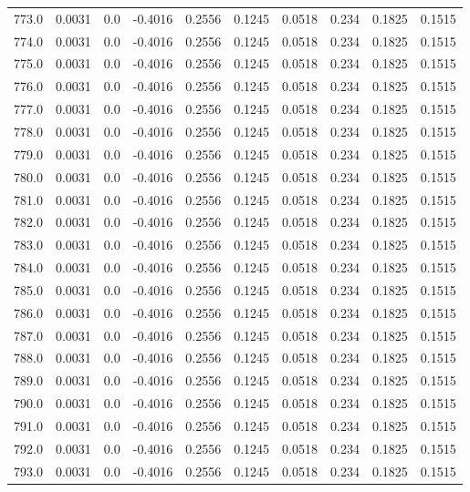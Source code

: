 \begin{longtable}{lrrrrrrrrr}
773.0 & 0.0031 & 0.0 & -0.4016 & 0.2556 & 0.1245 & 0.0518 & 0.234 & 0.1825 & 0.1515 \\
774.0 & 0.0031 & 0.0 & -0.4016 & 0.2556 & 0.1245 & 0.0518 & 0.234 & 0.1825 & 0.1515 \\
775.0 & 0.0031 & 0.0 & -0.4016 & 0.2556 & 0.1245 & 0.0518 & 0.234 & 0.1825 & 0.1515 \\
776.0 & 0.0031 & 0.0 & -0.4016 & 0.2556 & 0.1245 & 0.0518 & 0.234 & 0.1825 & 0.1515 \\
777.0 & 0.0031 & 0.0 & -0.4016 & 0.2556 & 0.1245 & 0.0518 & 0.234 & 0.1825 & 0.1515 \\
778.0 & 0.0031 & 0.0 & -0.4016 & 0.2556 & 0.1245 & 0.0518 & 0.234 & 0.1825 & 0.1515 \\
779.0 & 0.0031 & 0.0 & -0.4016 & 0.2556 & 0.1245 & 0.0518 & 0.234 & 0.1825 & 0.1515 \\
780.0 & 0.0031 & 0.0 & -0.4016 & 0.2556 & 0.1245 & 0.0518 & 0.234 & 0.1825 & 0.1515 \\
781.0 & 0.0031 & 0.0 & -0.4016 & 0.2556 & 0.1245 & 0.0518 & 0.234 & 0.1825 & 0.1515 \\
782.0 & 0.0031 & 0.0 & -0.4016 & 0.2556 & 0.1245 & 0.0518 & 0.234 & 0.1825 & 0.1515 \\
783.0 & 0.0031 & 0.0 & -0.4016 & 0.2556 & 0.1245 & 0.0518 & 0.234 & 0.1825 & 0.1515 \\
784.0 & 0.0031 & 0.0 & -0.4016 & 0.2556 & 0.1245 & 0.0518 & 0.234 & 0.1825 & 0.1515 \\
785.0 & 0.0031 & 0.0 & -0.4016 & 0.2556 & 0.1245 & 0.0518 & 0.234 & 0.1825 & 0.1515 \\
786.0 & 0.0031 & 0.0 & -0.4016 & 0.2556 & 0.1245 & 0.0518 & 0.234 & 0.1825 & 0.1515 \\
787.0 & 0.0031 & 0.0 & -0.4016 & 0.2556 & 0.1245 & 0.0518 & 0.234 & 0.1825 & 0.1515 \\
788.0 & 0.0031 & 0.0 & -0.4016 & 0.2556 & 0.1245 & 0.0518 & 0.234 & 0.1825 & 0.1515 \\
789.0 & 0.0031 & 0.0 & -0.4016 & 0.2556 & 0.1245 & 0.0518 & 0.234 & 0.1825 & 0.1515 \\
790.0 & 0.0031 & 0.0 & -0.4016 & 0.2556 & 0.1245 & 0.0518 & 0.234 & 0.1825 & 0.1515 \\
791.0 & 0.0031 & 0.0 & -0.4016 & 0.2556 & 0.1245 & 0.0518 & 0.234 & 0.1825 & 0.1515 \\
792.0 & 0.0031 & 0.0 & -0.4016 & 0.2556 & 0.1245 & 0.0518 & 0.234 & 0.1825 & 0.1515 \\
793.0 & 0.0031 & 0.0 & -0.4016 & 0.2556 & 0.1245 & 0.0518 & 0.234 & 0.1825 & 0.1515 \\

\end{longtable}
